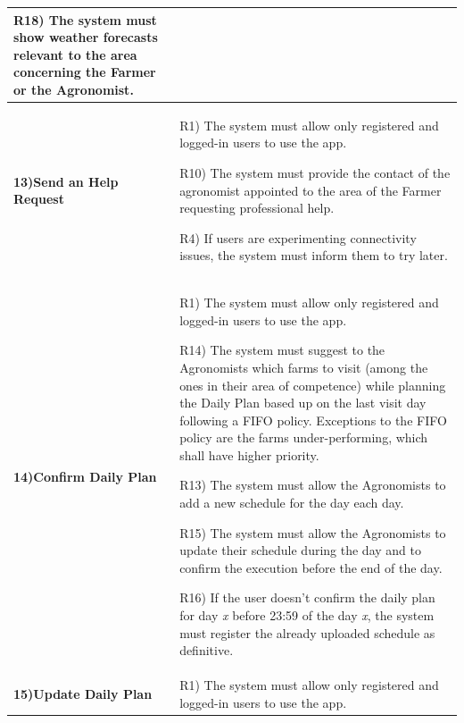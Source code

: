 \documentclass[table, 12pt]{article}
\begin{document}
\begin{itemize}
\begin{longtable}{|p{}|p{}|}
                                                                                    R18) The system must show weather forecasts relevant to the area concerning the Farmer or the Agronomist.\\\hline
                    \cellcolor{SpringGreen!50}\textbf{13)Send an Help Request}\centering &  R1) The system must allow only registered and logged-in users to use the app.
                    
                                                                                  R10) The system must provide the contact of the agronomist appointed to the area of the Farmer requesting professional help.
                                                                                  
                                                                                  R4) If users are experimenting connectivity issues, the system must inform them to try later.\\\hline
                    \cellcolor{SpringGreen!50}\textbf{14)Confirm Daily Plan}\centering &  R1) The system must allow only registered and logged-in users to use the app.
                    
                                                                                          R14) The system must suggest to the Agronomists which farms to visit (among the ones in their area of competence) while planning the Daily Plan based up on the last visit day following a FIFO policy. Exceptions to the FIFO policy are the farms under-performing, which shall have higher priority.

                                                                                          R13) The system must allow the Agronomists to add a new schedule for the day each day.
                                                                                        
                                                                                          R15) The system must allow the Agronomists to update their schedule during the day and to confirm the execution before the end of the day.
                                                                                          
                                                                                          R16) If the user doesn't confirm the daily plan for day \textit{x} before 23:59 of the day \textit{x}, the system must register the already uploaded schedule as definitive.\\\hline
                    \cellcolor{SpringGreen!50}\textbf{15)Update Daily Plan}\centering &  R1) The system must allow only registered and logged-in users to use the app.
                    

\end{longtable}
\end{itemize}
\end{document}
